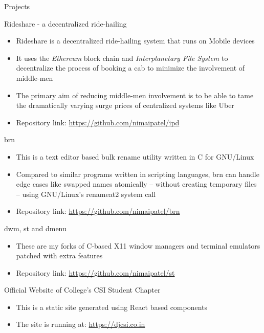 \documentclass{article}
\newlength{\tabin}
\newlength{\secsep}
\newcommand{\lineunder}{\vspace*{-8pt} \\ \hspace*{-6pt} \hrulefill \\ \vspace*{-15pt}}
\newenvironment{tabbedsection}[1]{
	\begin{list}{}{
		\setlength{\itemsep}{0pt}
		\setlength{\labelsep}{0pt}
		\setlength{\labelwidth}{0pt}
		\setlength{\leftmargin}{\tabin}
		\setlength{\rightmargin}{\tabin}
		\setlength{\listparindent}{0pt}
		\setlength{\parsep}{0pt}
		\setlength{\parskip}{0pt}
		\setlength{\partopsep}{0pt}
		\setlength{\topsep}{#1}
	}
	\item[]
}{\end{list}}
\newenvironment{resume_section}[1]{
	\filbreak
	\vspace{2\secsep}
	\textsc{\large#1}
	\lineunder
	\begin{tabbedsection}{\secsep}
}{\end{tabbedsection}}
\newenvironment{resume_subsection}[2][]{
	\textbf{#2} \hfill {\footnotesize #1} \hspace{2em}
	\begin{tabbedsection}{0.5\secsep}
}{\end{tabbedsection}}
\newenvironment{subitems}{
	\renewcommand{\labelitemi}{-}
	\begin{itemize}
		\setlength{\labelsep}{1em}
}{\end{itemize}}
\begin{document}
\begin{resume_section}{Projects}

	\begin{resume_subsection}{Rideshare - a decentralized ride-hailing}
		\begin{subitems}
			\item Rideshare is a decentralized ride-hailing system
				that runs on Mobile devices
			\item It uses the \textit{Ethereum} block chain and
				\textit{Interplanetary File System} to decentralize the
				process of booking a cab to minimize the
				involvement of middle-men
			\item The primary aim of reducing middle-men involvement
				is to be able to tame the dramatically varying
				surge prices of centralized systems like Uber
			\item Repository link:
				\href{https://github.com/nimaipatel/ipd}{https://github.com/nimaipatel/ipd}
		\end{subitems}
	\end{resume_subsection}

	\begin{resume_subsection}{brn}
		\begin{subitems}
			\item This is a text editor based bulk rename utility
				written in C for GNU/Linux
			\item Compared to similar programs written in scripting
				languages, brn can handle edge cases like
				swapped names atomically -- without creating
				temporary files -- using GNU/Linux's renameat2
				system call
			\item Repository link: \href{https://github.com/nimaipatel/brn}{https://github.com/nimaipatel/brn}
		\end{subitems}
	\end{resume_subsection}

	\begin{resume_subsection}{dwm, st and dmenu}
		\begin{subitems}
			\item These are my forks of C-based X11 window managers and terminal emulators patched with extra features
			\item Repository link: \href{https://github.com/nimaipatel/st}{https://github.com/nimaipatel/st}
		\end{subitems}
	\end{resume_subsection}

	\begin{resume_subsection}{Official Website of College's CSI Student Chapter}
		\begin{subitems}
			\item This is a static site generated using React based components
			\item The site is running at: \href{https://djcsi.co.in}{https://djcsi.co.in}
		\end{subitems}
	\end{resume_subsection}


\end{resume_section}
\end{document}
